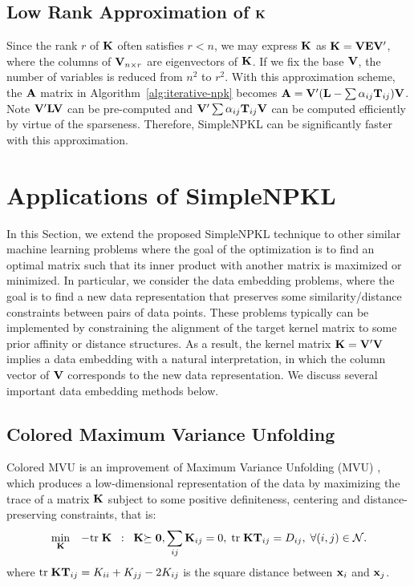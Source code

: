 \subsection{Low Rank Approximation of ${\bf K}$} \label{sec:lowrank}

Since the rank $r$ of ${\bf K}$ often satisfies $r < n$, we may express ${\bf K}$ as
${\bf K}={\bf V}{\bf E}{\bf V}'$, where the columns of ${\bf V}_{n\times r}$ are eigenvectors of ${\bf K}$. If
we fix the base ${\bf V}$, the number of variables is reduced from $n^2$ to $r^2$. With
this approximation scheme, the ${\bf A}$ matrix in Algorithm~\ref{alg:iterative-npk}
becomes ${\bf A} = {\bf V}'({\bf L} - \sum{\alpha}_{ij}{\bf T}_{ij}){\bf V}$. Note ${\bf V}'{\bf L}{\bf V}$ can be pre-computed
and ${\bf V}'\sum{\alpha}_{ij}{\bf T}_{ij}{\bf V}$ can be computed efficiently by virtue of the
sparseness. Therefore, SimpleNPKL can be significantly faster with this
approximation.



\section{Applications of SimpleNPKL} \label{sec:discuss}

In this Section, we extend the proposed SimpleNPKL technique to other similar
machine learning problems where the goal of the optimization is to find an optimal
matrix such that its inner product with another matrix is maximized or minimized. In
particular, we consider the data embedding problems, where the goal is to find a new
data representation that preserves some similarity/distance constraints between pairs
of data points. These problems typically can be implemented by constraining the
alignment of the target kernel matrix to some prior affinity or distance structures. As a
result, the kernel matrix ${\bf K}={\bf V}'{\bf V}$ implies a data embedding with a natural
interpretation, in which the column vector of ${\bf V}$ corresponds to the new data
representation. We discuss several important data embedding methods below.

\subsection{Colored Maximum Variance Unfolding} \label{sec:cmvu}

Colored MVU \cite{nips/SongSBG07} is an improvement of Maximum Variance
Unfolding (MVU) \cite{icml/WeinbergerSS04}, which produces a low-dimensional
representation of the data by maximizing the trace of a matrix ${\bf K}$ subject to some
positive definiteness, centering and distance-preserving constraints, that is:
\begin{eqnarray}
&\min_{\K}& -\tr\K \label{eqn:mvu} \;\;:\;\; \K\psd, \sum_{ij}\K_{ij} = 0, \; \tr\K \T_{ij} = D_{ij}, \; \forall (i, j)\in\mathcal N. \nonumber
\end{eqnarray}
where ${\mbox{tr}\;} {\bf K}{\bf T}_{ij} = K_{ii} + K_{jj} - 2K_{ij}$ is the square distance between
${\bf x}_i$ and ${\bf x}_j$.

